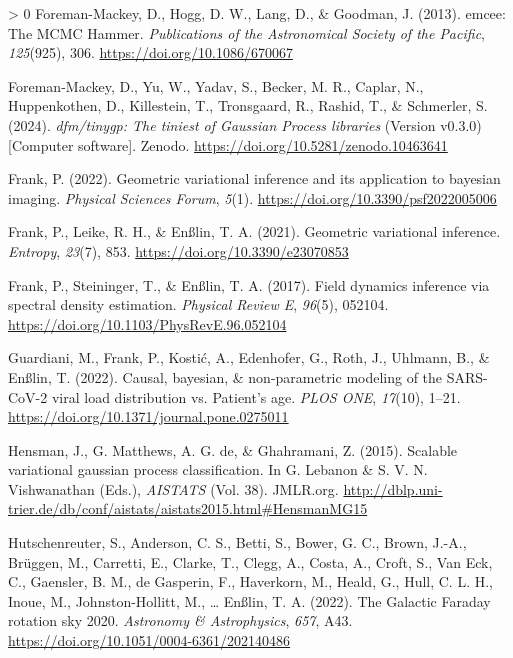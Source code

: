 \documentclass[10pt,a4paper,onecolumn]{article}
\newlength{\cslhangindent}
\newenvironment{CSLReferences}[3] %
 {%
  \setlength{\parindent}{0pt}
  \ifodd #1 \everypar{\setlength{\hangindent}{\cslhangindent}}\ignorespaces\fi
  \ifnum #2 > 0
  \setlength{\parskip}{#2\baselineskip}
  \fi
 }%
 {}
\begin{document}
\begin{CSLReferences}{1}{0}
\leavevmode\hypertarget{ref-ForemanMackey2013}{}%
Foreman-Mackey, D., Hogg, D. W., Lang, D., \& Goodman, J. (2013).
{emcee: The MCMC Hammer}. \emph{Publications of the Astronomical Society
of the Pacific}, \emph{125}(925), 306.
\url{https://doi.org/10.1086/670067}

\leavevmode\hypertarget{ref-ForemanMackey2024}{}%
Foreman-Mackey, D., Yu, W., Yadav, S., Becker, M. R., Caplar, N.,
Huppenkothen, D., Killestein, T., Tronsgaard, R., Rashid, T., \&
Schmerler, S. (2024). \emph{{dfm/tinygp: The tiniest of Gaussian Process
libraries}} (Version v0.3.0) {[}Computer software{]}. Zenodo.
\url{https://doi.org/10.5281/zenodo.10463641}

\leavevmode\hypertarget{ref-Frank2022}{}%
Frank, P. (2022). Geometric variational inference and its application to
bayesian imaging. \emph{Physical Sciences Forum}, \emph{5}(1).
\url{https://doi.org/10.3390/psf2022005006}

\leavevmode\hypertarget{ref-Frank2021}{}%
Frank, P., Leike, R. H., \& Enßlin, T. A. (2021). Geometric variational
inference. \emph{Entropy}, \emph{23}(7), 853.
\url{https://doi.org/10.3390/e23070853}

\leavevmode\hypertarget{ref-Frank2017}{}%
Frank, P., Steininger, T., \& Enßlin, T. A. (2017). {Field dynamics
inference via spectral density estimation}. \emph{Physical Review E},
\emph{96}(5), 052104. \url{https://doi.org/10.1103/PhysRevE.96.052104}

\leavevmode\hypertarget{ref-Guardiani2022}{}%
Guardiani, M., Frank, P., Kostić, A., Edenhofer, G., Roth, J., Uhlmann,
B., \& Enßlin, T. (2022). Causal, bayesian, \& non-parametric modeling
of the SARS-CoV-2 viral load distribution vs. Patient's age. \emph{PLOS
ONE}, \emph{17}(10), 1--21.
\url{https://doi.org/10.1371/journal.pone.0275011}

\leavevmode\hypertarget{ref-Hensman2015}{}%
Hensman, J., G. Matthews, A. G. de, \& Ghahramani, Z. (2015). Scalable
variational gaussian process classification. In G. Lebanon \& S. V. N.
Vishwanathan (Eds.), \emph{AISTATS} (Vol. 38). JMLR.org.
\url{http://dblp.uni-trier.de/db/conf/aistats/aistats2015.html\#HensmanMG15}

\leavevmode\hypertarget{ref-Hutschenreuter2022}{}%
Hutschenreuter, S., Anderson, C. S., Betti, S., Bower, G. C., Brown,
J.-A., Brüggen, M., Carretti, E., Clarke, T., Clegg, A., Costa, A.,
Croft, S., Van Eck, C., Gaensler, B. M., de Gasperin, F., Haverkorn, M.,
Heald, G., Hull, C. L. H., Inoue, M., Johnston-Hollitt, M., \ldots{}
Enßlin, T. A. (2022). {The Galactic Faraday rotation sky 2020}.
\emph{Astronomy \& Astrophysics}, \emph{657}, A43.
\url{https://doi.org/10.1051/0004-6361/202140486}


\end{CSLReferences}
\end{document}

